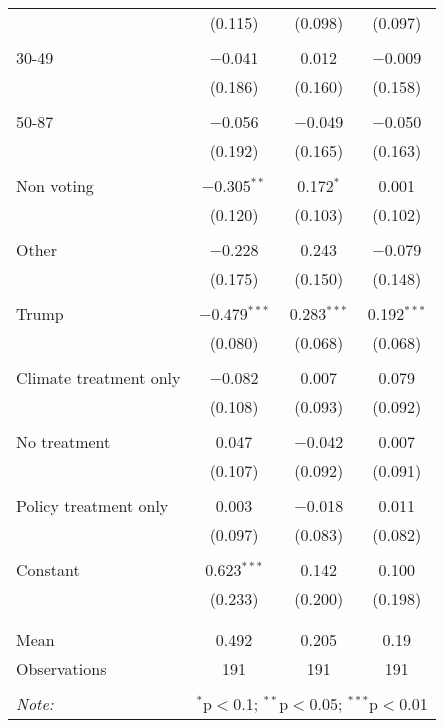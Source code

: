 \begin{tabular}{@{\extracolsep{5pt}}lccc}
  & (0.115) & (0.098) & (0.097) \\ 
  & & & \\ 
 30-49 & $-$0.041 & 0.012 & $-$0.009 \\ 
  & (0.186) & (0.160) & (0.158) \\ 
  & & & \\ 
 50-87 & $-$0.056 & $-$0.049 & $-$0.050 \\ 
  & (0.192) & (0.165) & (0.163) \\ 
  & & & \\ 
 Non voting & $-$0.305$^{**}$ & 0.172$^{*}$ & 0.001 \\ 
  & (0.120) & (0.103) & (0.102) \\ 
  & & & \\ 
 Other & $-$0.228 & 0.243 & $-$0.079 \\ 
  & (0.175) & (0.150) & (0.148) \\ 
  & & & \\ 
 Trump & $-$0.479$^{***}$ & 0.283$^{***}$ & 0.192$^{***}$ \\ 
  & (0.080) & (0.068) & (0.068) \\ 
  & & & \\ 
 Climate treatment only & $-$0.082 & 0.007 & 0.079 \\ 
  & (0.108) & (0.093) & (0.092) \\ 
  & & & \\ 
 No treatment & 0.047 & $-$0.042 & 0.007 \\ 
  & (0.107) & (0.092) & (0.091) \\ 
  & & & \\ 
 Policy treatment only & 0.003 & $-$0.018 & 0.011 \\ 
  & (0.097) & (0.083) & (0.082) \\ 
  & & & \\ 
 Constant & 0.623$^{***}$ & 0.142 & 0.100 \\ 
  & (0.233) & (0.200) & (0.198) \\ 
  & & & \\ 
\hline \\[-1.8ex] 
Mean & 0.492 & 0.205 & 0.19 \\ 
Observations & 191 & 191 & 191 \\ 
\hline 
\hline \\[-1.8ex] 
\textit{Note:}  & \multicolumn{3}{r}{$^{*}$p$<$0.1; $^{**}$p$<$0.05; $^{***}$p$<$0.01} \\ 
\end{tabular} 
